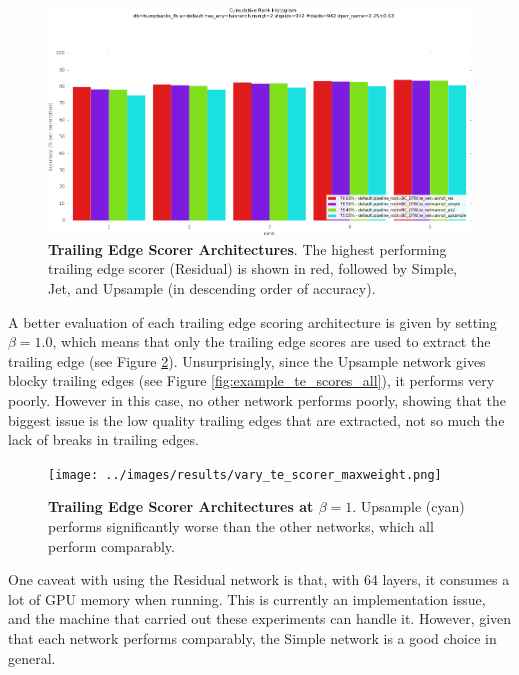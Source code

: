 \begin{figure}[t]%
\centering
\includegraphics[width=1\textwidth]{../images/results/vary_te_scorer.png}
\caption{\textbf{Trailing Edge Scorer Architectures}. The highest performing trailing edge scorer (Residual) is shown in red, followed by Simple, Jet, and Upsample (in descending order of accuracy).}
\label{fig:vary_te_scorer}
\end{figure}



A better evaluation of each trailing edge scoring architecture is given by setting $\beta = 1.0$, which means that only the trailing edge scores are used to extract the trailing edge (see Figure \ref{fig:vary_te_scorer_maxweight}).
Unsurprisingly, since the Upsample network gives blocky trailing edges (see Figure \ref{fig:example_te_scores_all}), it performs very poorly.
However in this case, no other network performs poorly, showing that the biggest issue is the low quality trailing edges that are extracted, not so much the lack of breaks in trailing edges.

\begin{figure}[t]%
\centering
\texttt{[image: ../images/results/vary\_te\_scorer\_maxweight.png]}
\caption{\textbf{Trailing Edge Scorer Architectures at $\beta = 1$}. Upsample (cyan) performs significantly worse than the other networks, which all perform comparably.}
\label{fig:vary_te_scorer_maxweight}
\end{figure}

One caveat with using the Residual network is that, with 64 layers, it consumes a lot of GPU memory when running.
This is currently an implementation issue, and the machine that carried out these experiments can handle it.
However, given that each network performs comparably, the Simple network is a good choice in general.

